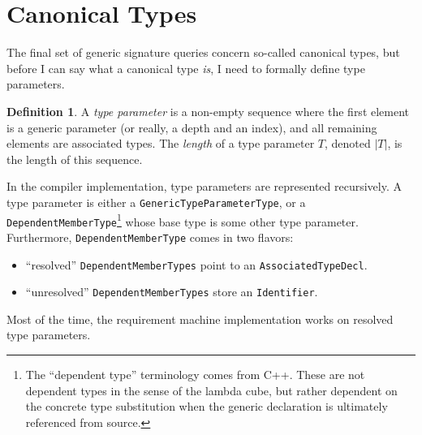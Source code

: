 \documentclass[headsepline,bibliography=totoc]{scrreport}
\theoremstyle{definition}
\theoremstyle{definition}
\newtheorem{definition}{Definition}[chapter]
\theoremstyle{definition}
\begin{document}
\section{Canonical Types}\label{canonicaltypes}

The final set of generic signature queries concern so-called canonical types, but before I can say what a canonical type \emph{is}, I need to formally define type parameters.


\begin{definition} A \emph{type parameter} is a non-empty sequence where the first element is a generic parameter (or really, a depth and an index), and all remaining elements are associated types. The \emph{length} of a type parameter $T$, denoted $|T|$, is the length of this sequence.
\end{definition}
\begin{leftbar}
\noindent In the compiler implementation, type parameters are represented recursively. A type parameter is either a \texttt{GenericTypeParameterType}, or a \texttt{DependentMemberType}\footnote{The ``dependent type'' terminology comes from C++. These are not dependent types in the sense of the lambda cube, but rather dependent on the concrete type substitution when the generic declaration is ultimately referenced from source.} whose base type is some other type parameter. Furthermore, \texttt{DependentMemberType} comes in two flavors:
\begin{itemize}
\item ``resolved'' \texttt{DependentMemberTypes} point to an \texttt{AssociatedTypeDecl}.
\item ``unresolved'' \texttt{DependentMemberTypes} store an \texttt{Identifier}.
\end{itemize}
Most of the time, the requirement machine implementation works on resolved type parameters.
\end{leftbar}
\end{document}
